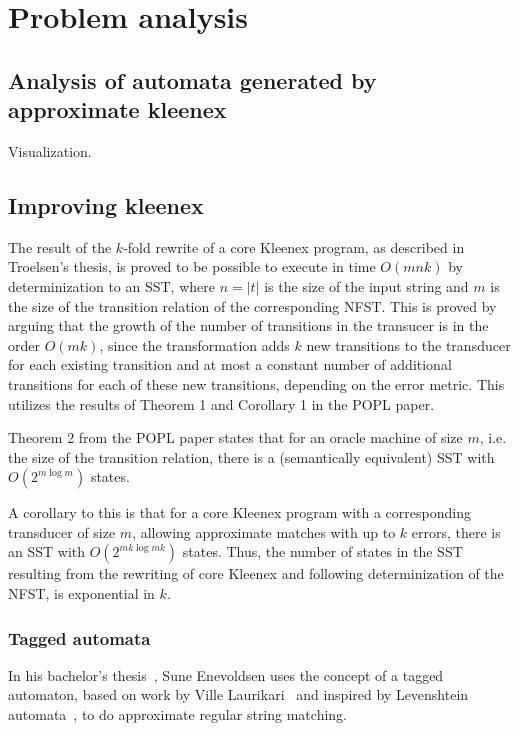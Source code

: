 \section{Problem analysis}

\subsection{Analysis of automata generated by approximate kleenex}

Visualization.

\subsection{Improving kleenex}


The result of the $k$-fold rewrite of a core Kleenex program, as described in
Troelsen's thesis, is proved to be possible to execute in time $O(mnk)$ by
determinization to an SST, where $n = |t|$ is the size of the input string and
$m$ is the size of the transition relation of the corresponding NFST. This is
proved by arguing that the growth of the number of transitions in the transucer
is in the order $O(mk)$, since the transformation adds $k$ new transitions to
the transducer for each existing transition and at most a constant number of
additional transitions for each of these new transitions, depending on the
error metric.  This utilizes the results of Theorem 1 and Corollary 1 in the
POPL paper.

Theorem 2 from the POPL paper states that for an oracle machine of size $m$,
i.e. the size of the transition relation, there is a (semantically equivalent)
SST with $O(2^{m \log m})$ states.

A corollary to this is that for a core Kleenex program with a corresponding
transducer of size $m$, allowing approximate matches with up to $k$ errors,
there is an SST with $O(2^{mk \log mk})$ states. Thus, the number of states in
the SST resulting from the rewriting of core Kleenex and following
determinization of the NFST, is exponential in $k$.



\subsubsection{Tagged automata}

In his bachelor's thesis~\cite{enevoldsen2015pattern}, Sune Enevoldsen uses the
concept of a tagged automaton, based on work by Ville
Laurikari~\cite{laurikari2000nfas, laurikari2001efficient} and inspired by
Levenshtein automata~\cite{schulz2002fast}, to do approximate regular string
matching.

